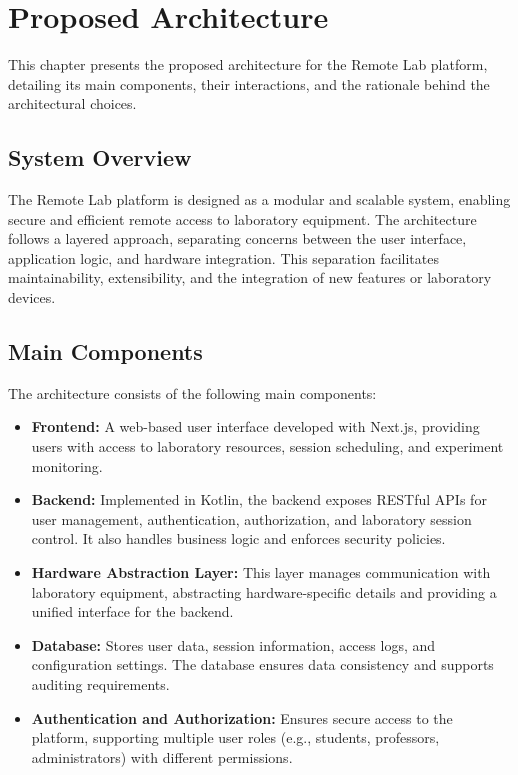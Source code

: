 %
%
\chapter{Proposed Architecture} \label{cap:proposed-architecture}

This chapter presents the proposed architecture for the Remote Lab platform, detailing its main components, their interactions, and the rationale behind the architectural choices.

%
%
\section{System Overview} \label{sec31}
The Remote Lab platform is designed as a modular and scalable system, enabling secure and efficient remote access to laboratory equipment. The architecture follows a layered approach, separating concerns between the user interface, application logic, and hardware integration. This separation facilitates maintainability, extensibility, and the integration of new features or laboratory devices.

%
%
\section{Main Components} \label{sec32}
The architecture consists of the following main components:
\begin{itemize}
    \item \textbf{Frontend:} A web-based user interface developed with Next.js, providing users with access to laboratory resources, session scheduling, and experiment monitoring.
    \item \textbf{Backend:} Implemented in Kotlin, the backend exposes RESTful APIs for user management, authentication, authorization, and laboratory session control. It also handles business logic and enforces security policies.
    \item \textbf{Hardware Abstraction Layer:} This layer manages communication with laboratory equipment, abstracting hardware-specific details and providing a unified interface for the backend.
    \item \textbf{Database:} Stores user data, session information, access logs, and configuration settings. The database ensures data consistency and supports auditing requirements.
    \item \textbf{Authentication and Authorization:} Ensures secure access to the platform, supporting multiple user roles (e.g., students, professors, administrators) with different permissions.
\end{itemize}

